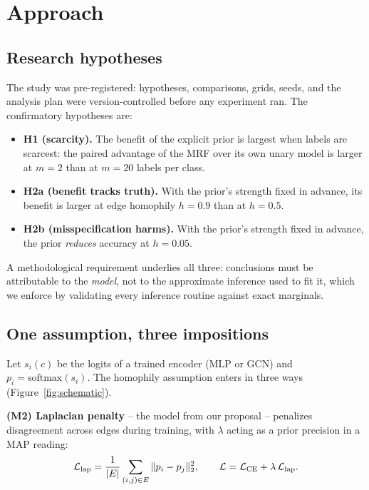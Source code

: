 \documentclass{article}
\begin{document}
\section{Approach}

\subsection{Research hypotheses}

The study was pre-registered: hypotheses, comparisons, grids, seeds, and the analysis plan were
version-controlled before any experiment ran. The confirmatory hypotheses are:

\begin{itemize}\itemsep2pt
\item \textbf{H1 (scarcity).} The benefit of the explicit prior is largest when labels are
scarcest: the paired advantage of the MRF over its own unary model is larger at $m{=}2$ than at
$m{=}20$ labels per class.
\item \textbf{H2a (benefit tracks truth).} With the prior's strength fixed in advance, its
benefit is larger at edge homophily $h{=}0.9$ than at $h{=}0.5$.
\item \textbf{H2b (misspecification harms).} With the prior's strength fixed in advance, the
prior \emph{reduces} accuracy at $h{=}0.05$.
\end{itemize}

A methodological requirement underlies all three: conclusions must be attributable to the
\emph{model}, not to the approximate inference used to fit it, which we enforce by validating
every inference routine against exact marginals.

\subsection{One assumption, three impositions}

Let $s_i(c)$ be the logits of a trained encoder (MLP or GCN) and
$p_i=\mathrm{softmax}(s_i)$. The homophily assumption enters in three ways
(Figure~\ref{fig:schematic}).

\textbf{(M2) Laplacian penalty} -- the model from our proposal -- penalizes disagreement across
edges during training, with $\lambda$ acting as a prior precision in a MAP reading:
\begin{equation}
\mathcal{L}_{\rm lap}=\frac{1}{|E|}\sum_{(i,j)\in E}\|p_i-p_j\|_2^2,\qquad
\mathcal{L}=\mathcal{L}_{\rm CE}+\lambda\,\mathcal{L}_{\rm lap}.
\end{equation}
\end{document}
